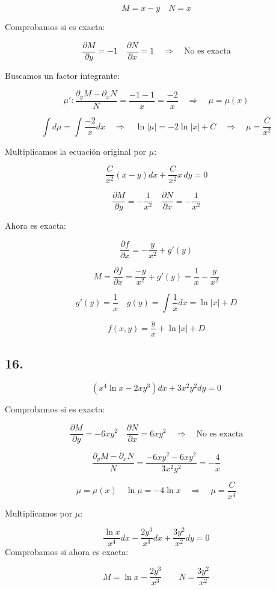 \documentclass[a4paper,12pt]{article}
\begin{document}
\[
M = x - y \quad N = x
\]

Comprobamos si es exacta:

\[
\frac{\partial M}{\partial y} = -1 \quad \frac{\partial N}{\partial x} = 1 \quad \Rightarrow \quad \text{No es exacta}
\]

Buscamos un factor integrante:

\[
\mu': \frac{\partial_y M - \partial_x N}{N} = \frac{-1 - 1}{x} = \frac{-2}{x} \quad \Rightarrow \quad \mu = \mu(x)
\]

\[
\int d\mu = \int \frac{-2}{x} dx \quad \Rightarrow \quad \ln|\mu| = -2 \ln|x| + C \quad \Rightarrow \quad \mu = \frac{C}{x^2}
\]

Multiplicamos la ecuación original por $\mu$:

\[
\frac{C}{x^2}(x - y) dx + \frac{C}{x^2} x\, dy = 0
\]

\[
\frac{\partial M}{\partial y} = -\frac{1}{x^2} \quad \frac{\partial N}{\partial x} = -\frac{1}{x^2}
\]

Ahora es exacta:

\[
\frac{\partial f}{\partial x} = -\frac{y}{x^2} + g'(y)
\]

\[
M = \frac{\partial f}{\partial x} = \frac{-y}{x^2} + g'(y) = \frac{1}{x} - \frac{y}{x^2}
\]

\[
g'(y) = \frac{1}{x} \quad g(y) = \int \frac{1}{x} dx = \ln|x| + D
\]

\[
f(x,y) = \frac{y}{x} + \ln|x| + D
\]


\subsection*{16.}
\[
(x^4 \ln x - 2x y^3) dx + 3x^2 y^2 dy = 0
\]

Comprobamos si es exacta:

\[
\frac{\partial M}{\partial y} = -6xy^2 \quad \frac{\partial N}{\partial x} = 6xy^2 \quad \Rightarrow \quad \text{No es exacta}
\]

\[
\frac{\partial_y M - \partial_x N}{N} = \frac{-6xy^2 - 6xy^2}{3x^2 y^2} = -\frac{4}{x}
\]

\[
\mu = \mu(x) \quad \ln \mu = -4 \ln x \quad \Rightarrow \quad \mu = \frac{C}{x^4}
\]

Multiplicamos por $\mu$:

\[
\frac{\ln x}{x^4} dx - \frac{2y^3}{x^3} dx + \frac{3y^2}{x^2} dy = 0
\]
Comprobamos si ahora es exacta:

\[
M = \ln x - \frac{2y^3}{x^3} 
\quad\quad 
N = \frac{3y^2}{x^2}
\]
\end{document}
